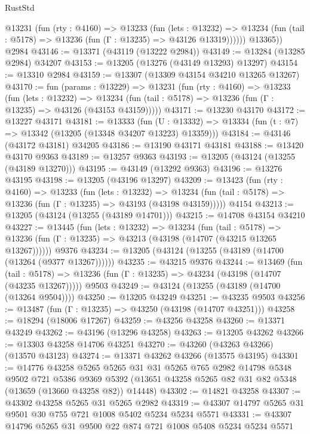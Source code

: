 \begin{lexlean}{RustStd}
\begin{coremodule}
          @13231
            (fun (rty : @4160) =>
            @13233
              (fun (lets : @13232) =>
              @13234 (fun (tail : @5178) => @13236 (fun (Γ : @13235) => @43126 @13319))))))
        @13365))
    @2984
@43146 := @13371 (@43119 (@13222 @2984))
@43149 := @13284 (@13285 @2984) @34207
@43153 := @13205 (@13276 (@43149 @13293) @13297)
@43154 := @13310 @2984
@43159 := @13307 (@13309 @43154 @34210 @13265 @13267)
@43170 := fun (params : @13229) =>
  @13231
    (fun (rty : @4160) =>
    @13233
      (fun (lets : @13232) =>
      @13234 (fun (tail : @5178) => @13236 (fun (Γ : @13235) => @43126 (@43153 @43159)))))
@43171 := @13230 @43170
@43172 := @13227 @43171
@43181 := @13333
    (fun (U : @13332) => @13334 (fun (t : @7) => @13342 (@13205 (@13348 @34207 @13223) @13359)))
@43184 := @43146 (@43172 @43181) @34205
@43186 := @13190 @43171 @43181
@43188 := @13420 @43170 @9363
@43189 := @13257 @9363
@43193 := @13205 (@43124 (@13255 (@43189 @13270)))
@43195 := @43149 (@13292 @9363)
@43196 := @13276 @43195
@43198 := @13205 (@43196 @13297)
@43209 := @13423
    (fun (rty : @4160) =>
    @13233
      (fun (lets : @13232) =>
      @13234 (fun (tail : @5178) => @13236 (fun (Γ : @13235) => @43193 (@43198 @43159)))))
    @4154
@43213 := @13205 (@43124 (@13255 (@43189 @14701)))
@43215 := @14708 @43154 @34210
@43227 := @13445
    (fun (lets : @13232) =>
    @13234
      (fun (tail : @5178) =>
      @13236 (fun (Γ : @13235) => @43213 (@43198 (@14707 (@43215 @13265 @13267))))))
    @9376
@43234 := @13205 (@43124 (@13255 (@43189 (@14700 (@13264 (@9377 @13267))))))
@43235 := @43215 @9376
@43244 := @13469
    (fun (tail : @5178) => @13236 (fun (Γ : @13235) => @43234 (@43198 (@14707 (@43235 @13267)))))
    @9503
@43249 := @43124 (@13255 (@43189 (@14700 (@13264 @9504))))
@43250 := @13205 @43249
@43251 := @43235 @9503
@43256 := @13487 (fun (Γ : @13235) => @43250 (@43198 (@14707 @43251)))
@43258 := @18294 (@18006 @17267)
@43259 := @43256 @43258
@43260 := @13371 @43249
@43262 := @43196 (@13296 @43258)
@43263 := @13205 @43262
@43266 := @13303 @43258 @14706 @43251
@43270 := @43260 (@43263 @43266) (@13570 @43123)
@43274 := @13371 @43262 @43266 (@13575 @43195)
@43301 := @14776
    @43258
    @5265
    @5265
    @31
    @31
    @5265
    @765
    @2982
    @14798
    @5348
    @9502
    @721
    @5386
    @9369
    @5392
    (@13651 @43258 @5265 @82 @31 @82 @5348 (@13659 (@13660 @43258 @82)) @14448)
@43302 := @14821 @43258
@43307 := @43302 @43258 @5265 @31 @5265 @2982
@43319 := @43307 @14797 @5265 @31 @9501 @30 @755 @721 @1008 @5402 @5234 @5234 @5571
@43331 := @43307 @14796 @5265 @31 @9500 @22 @874 @721 @1008 @5408 @5234 @5234 @5571

\end{coremodule}
\end{lexlean}

